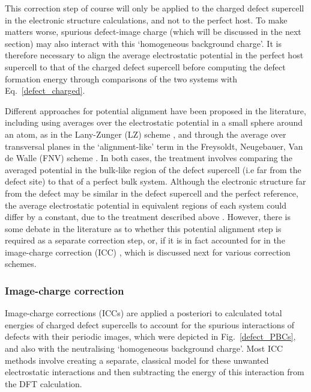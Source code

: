 \documentclass[11pt, twoside]{report}
\begin{document}
This correction step of course will only be applied to the charged defect supercell in the electronic structure calculations, and not to the perfect host. To make matters worse, spurious defect-image charge (which will be discussed in the next section) may also interact with this `homogeneous background charge'.
It is therefore necessary to align the average electrostatic potential in the perfect host supercell to that of the charged defect supercell before computing the defect formation energy through comparisons of the two systems with Eq.~\ref{defect_charged}.
 
Different approaches for potential alignment have been proposed in the literature, including using averages over the electrostatic potential in a small sphere around an atom, as in the Lany-Zunger (LZ) scheme \cite{Lany_defects}, and through the average over transversal planes in the `alignment-like' term in the Freysoldt, Neugebauer, Van de Walle (FNV) scheme \cite{FNV, kumagai_oba}. In both cases, the treatment involves comparing the averaged potential in the bulk-like region of the defect supercell (i.e far from the defect site) to that of a perfect bulk system. Although the electronic structure far from the defect may be similar in the defect supercell and the perfect reference, the average electrostatic potential in equivalent regions of each system could differ by a constant, due to the treatment described above \cite{komsa}. 
However, there is some debate in the literature as to whether this potential alignment step is required as a separate correction step, or, if it is in fact accounted for in the image-charge correction (ICC) \cite{kumagai_oba}, which is discussed next for various correction schemes. 


\subsubsection{Image-charge correction}
Image-charge corrections (ICCs) are applied a posteriori to calculated total energies of charged defect supercells to account for the spurious interactions of defects with their periodic images, which were depicted in Fig.~\ref{defect_PBCs}, and also with the neutralising `homogeneous background charge'. Most ICC methods involve creating a separate, classical model for these unwanted electrostatic interactions and then subtracting the energy of this interaction from the DFT calculation.
\end{document}
